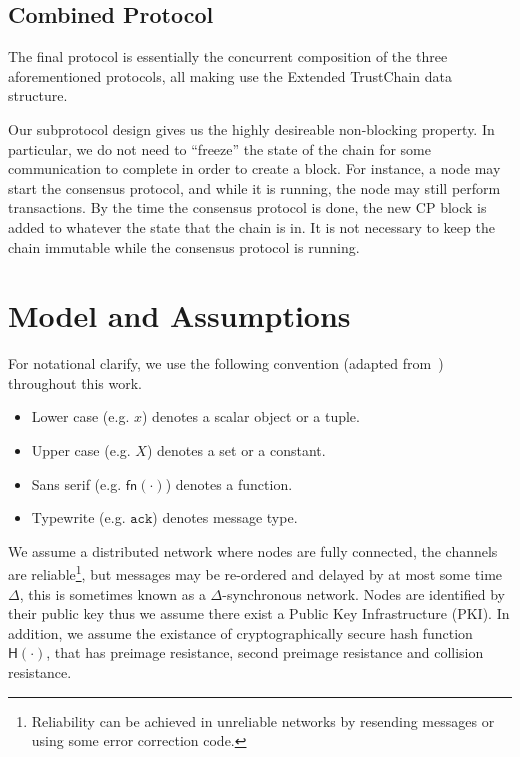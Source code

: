 \subsection{Combined Protocol}
\label{sec:combined-protocol}
The final protocol is essentially the concurrent composition of the three aforementioned protocols,
all making use the Extended TrustChain data structure.

Our subprotocol design gives us the highly desireable non-blocking property.
In particular, we do not need to ``freeze'' the state of the chain for some communication to complete in order to create a block.
For instance, a node may start the consensus protocol, and while it is running, the node may still perform transactions.
By the time the consensus protocol is done, the new CP block is added to whatever the state that the chain is in.
It is not necessary to keep the chain immutable while the consensus protocol is running.

\section{Model and Assumptions}
\label{sec:model-assumptions}

For notational clarify, we use the following convention (adapted from~\cite{miller2016honey}) throughout this work.
\begin{itemize}
\item Lower case (e.g. $x$) denotes a scalar object or a tuple.
\item Upper case (e.g. $X$) denotes a set or a constant.
\item Sans serif (e.g. $\textsf{fn}(\cdot)$) denotes a function.
\item Typewrite (e.g. $\texttt{ack}$) denotes message type.
\end{itemize}

We assume a distributed network where nodes are fully connected,
the channels are reliable\footnote{
    Reliability can be achieved in unreliable networks by resending messages or using some error correction code.
},
but messages may be re-ordered and delayed by at most some time $\Delta$,
this is sometimes known as a $\Delta$-synchronous network.
Nodes are identified by their public key thus we assume there exist a Public Key Infrastructure (PKI).
In addition, we assume the existance of cryptographically secure hash function $\textsf{H}(\cdot)$,
that has preimage resistance, second preimage resistance and collision resistance.

